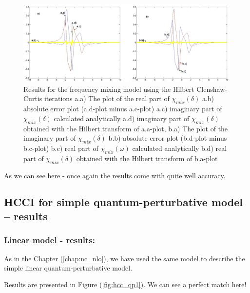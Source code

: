 \documentclass[12pt,twoside,a4paper]{article}
\numberwithin{equation}{subsection}
\numberwithin{figure}{subsection}
\begin{document}
\begin{figure} 
  \includegraphics[width=150mm]{img/hcc_fmix.png}
  \caption{Results for the frequency mixing model using the Hilbert Clenshaw-Curtis iterations
     a.a) The plot of the real part of ${\chi_{mix}}(\delta )$
     a.b) absolute error plot (a.d-plot minus a.c-plot) 
     a.c) imaginary part of ${\chi_{mix}}(\delta )$ calculated analytically 
     a.d) imaginary part of ${\chi_{mix}}(\delta )$ obtained with the Hilbert transform of a.a-plot, 
     b.a) The plot of the imaginary part of ${\chi_{mix}}(\delta )$ 
     b.b) absolute error plot (b.d-plot minus b.c-plot) 
     b.c) real part of $\chi_{mix} (\omega )$ calculated analytically 
     b.d) real part of ${\chi_{mix}}(\delta )$ obtained with the Hilbert transform of b.a-plot 
     \label{fig:hcci_fmix}
    }
\end{figure}

As we can see here - once again the results come with quite well accuracy.

\subsection{HCCI for simple quantum-perturbative model -- results} \label{chap:hcc_quantum}
 
\subsubsection*{Linear model - results:}

As in the Chapter (\ref{chap:nc_nlo}), we have used the same model to describe the simple linear quantum-perturbative model.

Results are presented in Figure (\ref{fig:hcc_qp1}). We can see a perfect match here!
\end{document}
